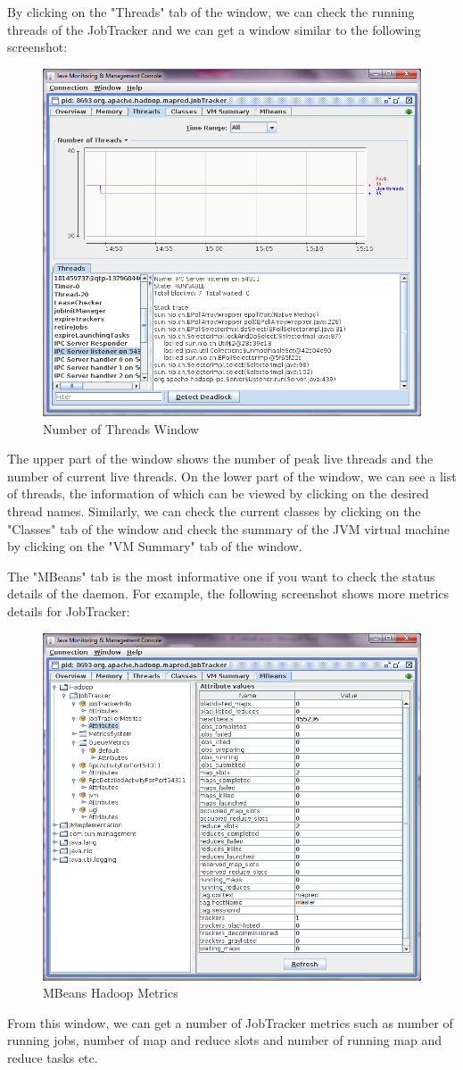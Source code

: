 By clicking on the "Threads" tab of the window, we can check the running threads of the JobTracker and we can get a window similar to the following screenshot:
\begin{figure}[ht]
  \centering
  \includegraphics[width=.8\textwidth]{figs/5163os_06_04.png}
  \caption{Number of Threads Window}\label{fig:num.threads}
\end{figure} 
The upper part of the window shows the number of peak live threads and the number of current live threads. On the lower part of the window, we can see a list of threads, the information of which can be viewed by clicking on the desired thread names.
Similarly, we can check the current classes by clicking on the "Classes" tab of the window and check the summary of the JVM virtual machine by clicking on the "VM Summary" tab of the window.

The "MBeans" tab is the most informative one if you want to check the status details of the daemon. For example, the following screenshot shows more metrics details for JobTracker:
\begin{figure}[ht]
  \centering
  \includegraphics[width=.8\textwidth]{figs/5163os_06_05.png}
  \caption{MBeans Hadoop Metrics}\label{fig:mbeans.hadoop.metrics}
\end{figure} 
From this window, we can get a number of JobTracker metrics such as number of running jobs, number of map and reduce slots and number of running map and reduce tasks etc.
